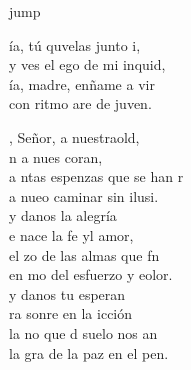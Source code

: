 \begin{cancion}jump\\
	\begin{chorus}%
		ía, tú quvelas junto i,\\
		y ves el ego de mi inquid,\\
		ía, madre, enñame a vir \\
		con ritmo are de juven.\jump\\
	\end{chorus}%
	, Señor, a nuestraold,\\
	n a nues coran,\\
	a ntas espenzas que se han r\\
	a nueo caminar sin ilusi.\\
	\jump
	 y danos la alegría \\
	e nace la fe yl amor,\\
	el zo de las almas que fn\\
	en mo del esfuerzo y eolor.\\
	\jump
	 y danos tu esperan  \\
	ra sonre en la icción\\
	la no que d suelo nos an\\
	la gra de la paz en el pen. \\
	\jump
\end{cancion}%
